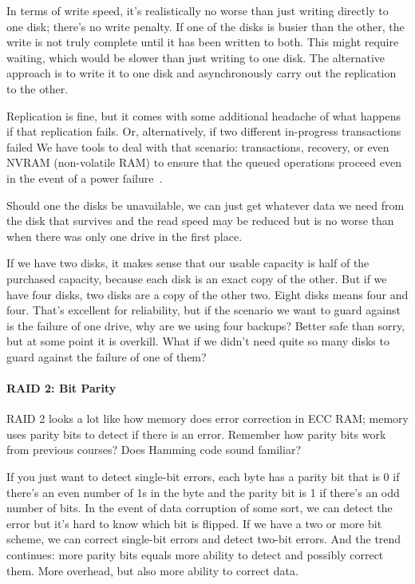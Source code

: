 In terms of write speed, it's realistically no worse than just writing directly to one disk; there's no write penalty. If one of the disks is busier than the other, the write is not truly complete until it has been written to both. This might require waiting, which would be slower than just writing to one disk. The alternative approach is to write it to one disk and asynchronously carry out the replication to the other. 

Replication is fine, but it comes with some additional headache of what happens if that replication fails. Or, alternatively, if two different in-progress transactions failed  We have tools to deal with that scenario: transactions, recovery, or even NVRAM (non-volatile RAM) to ensure that the queued operations proceed even in the event of a power failure~\cite{osc}.

Should one the disks be unavailable, we can just get whatever data we need from the disk that survives and the read speed may be reduced but is no worse than when there was only one drive in the first place.

If we have two disks, it makes sense that our usable capacity is half of the purchased capacity, because each disk is an exact copy of the other. But if we have four disks, two disks are a copy of the other two. Eight disks means four and four. That's excellent for reliability, but if the scenario we want to guard against is the failure of one drive, why are we using four backups? Better safe than sorry, but at some point it is overkill. What if we didn't need quite so many disks to guard against the failure of one of them?

\paragraph{RAID 2: Bit Parity}
RAID 2 looks a lot like how memory does error correction in ECC RAM; memory uses parity bits to detect if there is an error. Remember how parity bits work from previous courses? Does Hamming code sound familiar?

If you just want to detect single-bit errors, each byte has a parity bit that is 0 if there's an even number of 1s in the byte and the parity bit is 1 if there's an odd number of bits. In the event of data corruption of some sort, we can detect the error but it's hard to know which bit is flipped. If we have a two or more bit scheme, we can correct single-bit errors and detect two-bit errors. And the trend continues: more parity bits equals more ability to detect and possibly correct them. More overhead, but also more ability to correct data.


